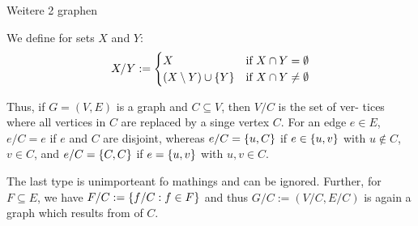 \begin{xmp+}
	Weitere 2 graphen
\end{xmp+}

We define for sets $X$ and $Y$: \[
	X/Y:= 
		\begin{cases}
			X & \text{if } X \cap Y=\emptyset \\
			(X\setminus Y) \cup \left\{Y\right\} & \text{if } X \cap Y \neq \emptyset
		\end{cases}
\]

Thus, if $G=(V,E)$ is a graph and $C\subseteq V$, then $V/C$ is the set of ver-
tices where all vertices in $C$ are replaced by a singe vertex $C$.
For an edge $e\in E$, $e/C= e$ if $e$ and $C$ are disjoint, whereas $e/C=
\left\{u,C\right\}$ if $e \in \left\{u,v\right\}$ with $u \not \in C$, $v \in C$, and
$e/C=\left\{C,C\right\}$ if $e = \left\{u,v\right\}$ with $u,v \in C$.

The last type is unimporteant fo mathings and can be ignored. Further, for 
$F \subseteq E$, we have $F/C:= \left\{f/C: f\in F\right\}$ and thus $G/C:=(V/C,E/C)$
is again a graph which results from  of $C$.
